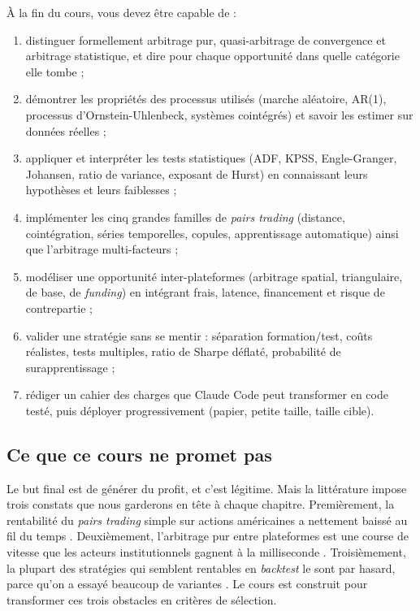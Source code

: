 \documentclass[11pt,a4paper]{article}
\begin{document}
À la fin du cours, vous devez être capable de :
\begin{enumerate}[label=\textbf{O\arabic*.}]
\item distinguer formellement arbitrage pur, quasi-arbitrage de convergence et arbitrage statistique, et dire pour chaque opportunité dans quelle catégorie elle tombe ;
\item démontrer les propriétés des processus utilisés (marche aléatoire, AR(1), processus d'Ornstein-Uhlenbeck, systèmes cointégrés) et savoir les estimer sur données réelles ;
\item appliquer et interpréter les tests statistiques (ADF, KPSS, Engle-Granger, Johansen, ratio de variance, exposant de Hurst) en connaissant leurs hypothèses et leurs faiblesses ;
\item implémenter les cinq grandes familles de \emph{pairs trading} (distance, cointégration, séries temporelles, copules, apprentissage automatique) ainsi que l'arbitrage multi-facteurs ;
\item modéliser une opportunité inter-plateformes (arbitrage spatial, triangulaire, de base, de \emph{funding}) en intégrant frais, latence, financement et risque de contrepartie ;
\item valider une stratégie sans se mentir : séparation formation/test, coûts réalistes, tests multiples, ratio de Sharpe déflaté, probabilité de surapprentissage ;
\item rédiger un cahier des charges que Claude Code peut transformer en code testé, puis déployer progressivement (papier, petite taille, taille cible).
\end{enumerate}

\subsection{Ce que ce cours ne promet pas}

Le but final est de générer du profit, et c'est légitime. Mais la littérature impose trois constats que nous garderons en tête à chaque chapitre. Premièrement, la rentabilité du \emph{pairs trading} simple sur actions américaines a nettement baissé au fil du temps \citep{dofaff2010,dofaff2012}. Deuxièmement, l'arbitrage pur entre plateformes est une course de vitesse que les acteurs institutionnels gagnent à la milliseconde \citep{budish2015}. Troisièmement, la plupart des stratégies qui semblent rentables en \emph{backtest} le sont par hasard, parce qu'on a essayé beaucoup de variantes \citep{bailey2014dsr,harvey2016}. Le cours est construit pour transformer ces trois obstacles en critères de sélection.
\end{document}
